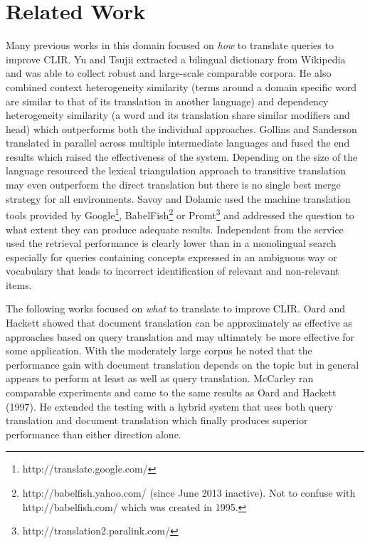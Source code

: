 \documentclass[journal]{IEEEtran}
\begin{document}



\section{Related Work}
Many previous works in this domain focused on \textit{how} to translate queries to improve CLIR.
Yu and Tsujii \cite{yu09} extracted a bilingual dictionary from Wikipedia and was able to collect robust and large-scale comparable corpora.
He also combined context heterogeneity similarity (terms around a domain specific word are similar to that of its translation in another language) and dependency heterogeneity similarity (a word and its translation share similar modifiers and head) which outperforms both the individual approaches.
Gollins and Sanderson \cite{gollins01} translated in parallel across multiple intermediate languages and fused the end results which raised the effectiveness of the system.
Depending on the size of the language resourced the lexical triangulation approach to transitive translation may even outperform the direct translation but there is no single best merge strategy for all environments.
Savoy and Dolamic \cite{savoy09} used the machine translation tools provided by Google\footnote{http://translate.google.com/}, BabelFish\footnote{http://babelfish.yahoo.com/ (since June 2013 inactive). Not to confuse with http://babelfish.com/ which was created in 1995.} or Promt\footnote{http://translation2.paralink.com/} and addressed the question to what extent they can produce adequate results.
Independent from the service used the retrieval performance is clearly lower than in a monolingual search especially for queries containing concepts expressed in an ambiguous way or vocabulary that leads to incorrect identification of relevant and non-relevant items.

The following works focused on \textit{what} to translate to improve CLIR.
Oard and Hackett \cite{oard97b} showed that document translation can be approximately as effective as approaches based on query translation and may ultimately be more effective for some application.
With the moderately large corpus he noted that the performance gain with document translation depends on the topic but in general appears to perform at least as well as query translation.
McCarley \cite{mccarley99} ran comparable experiments and came to the same results as Oard and Hackett (1997).
He extended the testing with a hybrid system that uses both query translation and document translation which finally produces superior performance than either direction alone.
\end{document}

